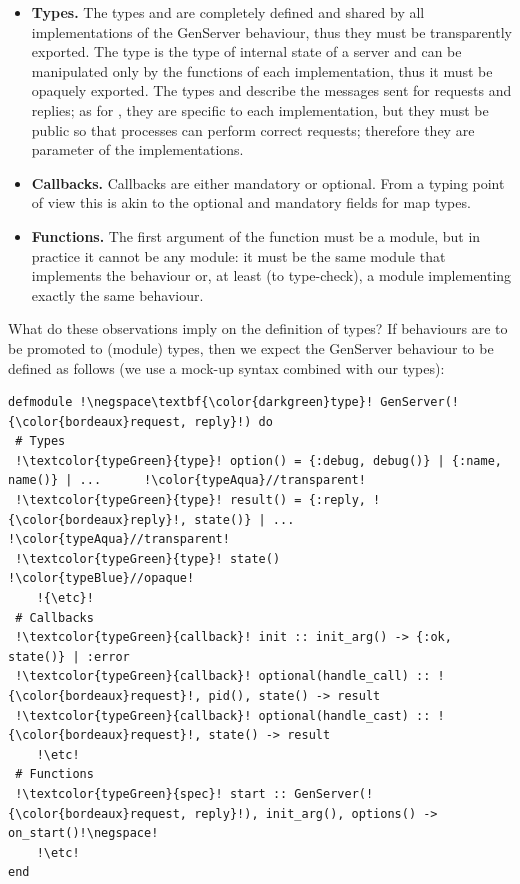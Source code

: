 \documentclass[a4paper,10pt]{article}
\begin{document}
\begin{itemize}
  \item \textbf{Types.} The types  and  are completely defined and  shared by all implementations of the GenServer behaviour, thus they must be transparently exported. The type  is the type of internal state of a server and can be manipulated only by the functions of each implementation, thus it must be opaquely exported. The types  and  describe the messages sent for requests and replies; as for , they are specific to each implementation, but they must be public so that processes can perform correct requests; therefore they are parameter of the implementations.

  \item \textbf{Callbacks.} Callbacks are either mandatory or optional. From a typing point of view this is akin to the optional and mandatory fields for map types.

  \item \textbf{Functions.} The first argument of the  function must be a module, but in practice it cannot be any module: it must be the same module that implements the behaviour or, at least (to type-check), a module implementing exactly the same behaviour.
\end{itemize}
What do these observations imply on the definition of types? If
behaviours are to be promoted to (module) types, then we expect the
GenServer behaviour to be defined as follows (we use a mock-up syntax
combined with our types):
\begin{verbatim}
defmodule !\negspace\textbf{\color{darkgreen}type}! GenServer(!{\color{bordeaux}request, reply}!) do
 # Types
 !\textcolor{typeGreen}{type}! option() = {:debug, debug()} | {:name, name()} | ...      !\color{typeAqua}//transparent!
 !\textcolor{typeGreen}{type}! result() = {:reply, !{\color{bordeaux}reply}!, state()} | ...                   !\color{typeAqua}//transparent!
 !\textcolor{typeGreen}{type}! state()                                                   !\color{typeBlue}//opaque!
    !{\etc}!
 # Callbacks
 !\textcolor{typeGreen}{callback}! init :: init_arg() -> {:ok, state()} | :error      
 !\textcolor{typeGreen}{callback}! optional(handle_call) :: !{\color{bordeaux}request}!, pid(), state() -> result
 !\textcolor{typeGreen}{callback}! optional(handle_cast) :: !{\color{bordeaux}request}!, state() -> result        
    !\etc!
 # Functions
 !\textcolor{typeGreen}{spec}! start :: GenServer(!{\color{bordeaux}request, reply}!), init_arg(), options() -> on_start()!\negspace!
    !\etc!
end
\end{verbatim}
\end{document}
